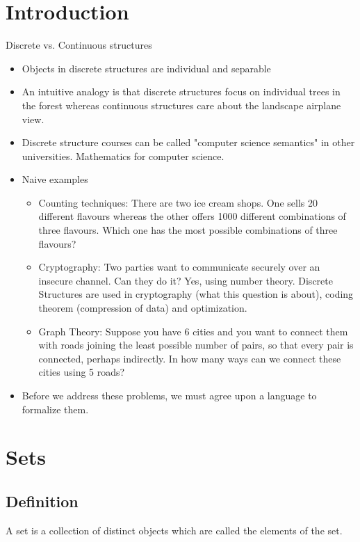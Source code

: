 \documentclass[9pt, letterpaper, oneside]{article}
\begin{document}
\section*{Introduction}
Discrete vs. Continuous structures
\begin{itemize}
	\item Objects in discrete structures are individual and separable
	\item An intuitive analogy is that discrete structures focus on individual trees in the forest whereas continuous structures care about the landscape airplane view.
	\item Discrete structure courses can be called "computer science semantics" in other universities. Mathematics for computer science.
	\item Naive examples
	\begin{itemize}
		\item Counting techniques: There are two ice cream shops. One sells 20 different flavours whereas the other offers 1000 different combinations of three flavours. Which one has the most possible combinations of three flavours?
		\item Cryptography: Two parties want to communicate securely over an insecure channel. Can they do it? Yes, using number theory. Discrete Structures are used in cryptography (what this question is about), coding theorem (compression of data) and optimization.
		\item Graph Theory: Suppose you have 6 cities and you want to connect them with roads joining the least possible number of pairs, so that every pair is connected, perhaps indirectly. In how many ways can we connect these cities using 5 roads?
	\end{itemize}
	\item Before we address these problems, we must agree upon a language to formalize them.
\end{itemize}

\section{Sets}

\subsection{Definition}
A set is a collection of distinct objects which are called the elements of the set.
\end{document}

